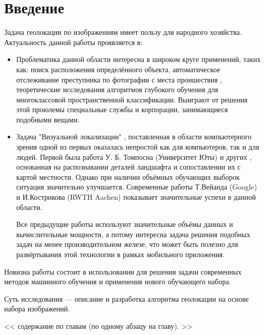 \chapter*{Введение}
\label{sec:afterwords}

Задача геолокации по изображениям имеет пользу для народного хозяйства.
Актуальность данной работы проявляется в:
	\begin{itemize}
		\item Проблематика данной области интересна в широком круге применений, таких как: 
		поиск расположения определённого объекта, автоматическое отслеживание преступника по фотографии с места проишествия , теоретические исследования алгоритмов глубокого обучения для многоклассовой пространственной классификации. Выиграют от решения этой проюлемы специальные службы и корпорации, занимающиеся подобными вещами.
		\item Задача "Визуальной локализации" \cite{im2gps}, поставленная в области
		компьютерного зрения одной из первых оказалась непростой как для компьютеров,
		так и для людей. Первой была работа У. Б. Томпосна (Университет Юты) и других \cite{Thompson1999geomReas}, основанная на распознавании деталей ландшафта и сопоставлении их с картой местности.
		Однако при наличии объёмных обучающих выборок ситуация значительно улучшается. Современные работы Т.Вейанда (Google) и И.Кострикова (RWTH Aachen) \cite{weyand2016planet} показывает значительные успехи в данной области.
		
		Все предыдущие работы используют значительные объёмы данных и вычислительные мощности, а потому интересна задача решения подобных задач на менее производительном железе, что может быть полезно для развёртывания этой  технологии в рамках мобильного приложения.
	\end{itemize}
	Новизна работы состоит в использовании для решения задачи современных методов машинного обучения и применения нового обучающего набора.
	
	Суть исследования --- описание и разработка алгоритма геолокации на основе набора изображений.
	
<<	содержание по главам (по одному абзацу на главу). >>

